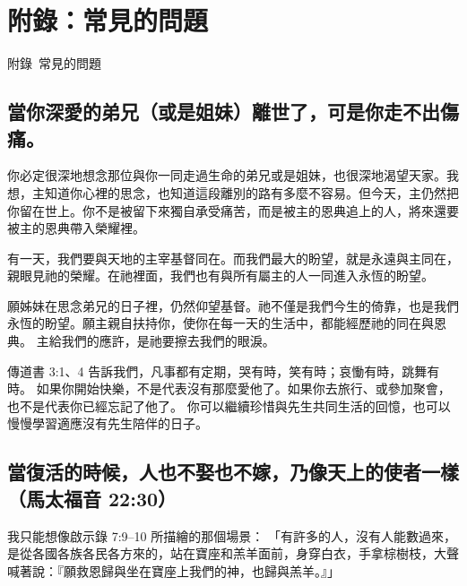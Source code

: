 
\appendix
\renewcommand{\appendixname}{附錄}
\renewcommand{\thechapter}{\arabic{chapter}}
\renewcommand{\thefigure}{\appendixname~\thechapter.\arabic{figure}}  %

\chapter*{附錄：常見的問題}
%
  {\appendixname~\thechapter\quad 常見的問題}



\section*{當你深愛的弟兄（或是姐妹）離世了，可是你走不出傷痛。}

你必定很深地想念那位與你一同走過生命的弟兄或是姐妹，也很深地渴望天家。我想，主知道你心裡的思念，也知道這段離別的路有多麼不容易。但今天，主仍然把你留在世上。你不是被留下來獨自承受痛苦，而是被主的恩典追上的人，將來還要被主的恩典帶入榮耀裡。

有一天，我們要與天地的主宰基督同在。而我們最大的盼望，就是永遠與主同在，親眼見祂的榮耀。在祂裡面，我們也有與所有屬主的人一同進入永恆的盼望。

願姊妹在思念弟兄的日子裡，仍然仰望基督。祂不僅是我們今生的倚靠，也是我們永恆的盼望。願主親自扶持你，使你在每一天的生活中，都能經歷祂的同在與恩典。
主給我們的應許，是祂要擦去我們的眼淚。

傳道書 3:1、4 告訴我們，凡事都有定期，哭有時，笑有時；哀慟有時，跳舞有時。
如果你開始快樂，不是代表沒有那麼愛他了。如果你去旅行、或參加聚會，也不是代表你已經忘記了他了。
你可以繼續珍惜與先生共同生活的回憶，也可以慢慢學習適應沒有先生陪伴的日子。


\section*{當復活的時候，人也不娶也不嫁，乃像天上的使者一樣（馬太福音 22:30）}

我只能想像啟示錄 7:9--10 所描繪的那個場景：
「有許多的人，沒有人能數過來，是從各國各族各民各方來的，站在寶座和羔羊面前，身穿白衣，手拿棕樹枝，大聲喊著說：『願救恩歸與坐在寶座上我們的神，也歸與羔羊。』」

